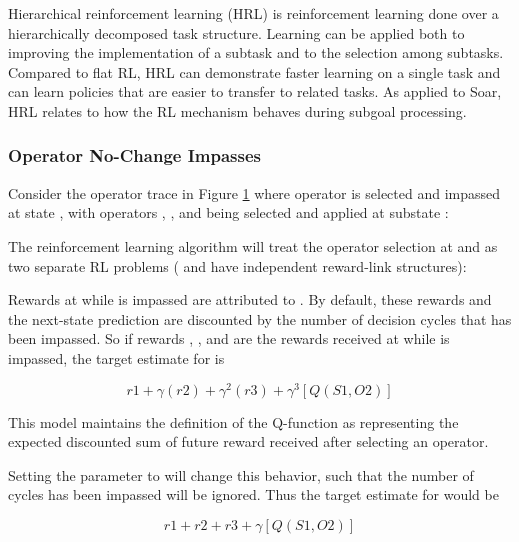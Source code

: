 Hierarchical reinforcement learning (HRL) is reinforcement learning done over a hierarchically decomposed task structure. Learning can be applied both to improving the implementation of a subtask and to the selection among subtasks. Compared to flat RL, HRL can demonstrate faster learning on a single task and can learn policies that are easier to transfer to related tasks. As applied to Soar, HRL relates to how the RL mechanism behaves during subgoal processing.

\subsubsection{Operator No-Change Impasses}
Consider the operator trace in Figure \ref{fig:rl-optrace} where operator  is selected and impassed at state , with operators , , and  being selected and applied at substate :

\begin{figure}
\label{fig:rl-optrace}
\end{figure}

The reinforcement learning algorithm will treat the operator selection at  and  as two separate RL problems ( and  have independent reward-link structures):

\begin{list}{S1}
\item Rewards at  while  is impassed are attributed to . By default, these rewards and the next-state prediction are discounted by the number of decision cycles that  has been impassed.  So if rewards , , and  are the rewards received at  while  is impassed, the target estimate for  is

$$r1 + \gamma(r2) + \gamma^2(r3) + \gamma^3[  Q(S1, O2)  ]$$

This model maintains the definition of the Q-function as representing the expected discounted sum of future reward received after selecting an operator.

Setting the  parameter to  will change this behavior, such that the number of cycles  has been impassed will be ignored.  Thus the target estimate for  would be

$$r1 + r2 + r3 + \gamma[  Q(S1, O2)  ]$$

\end{list}

